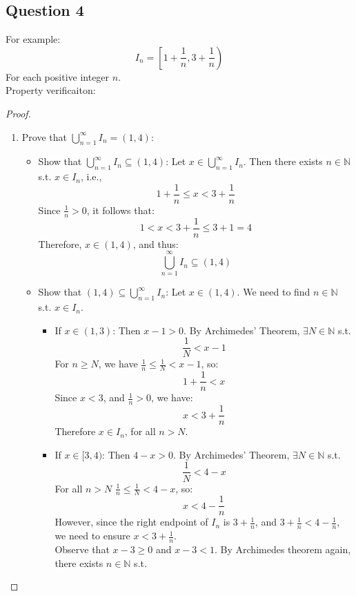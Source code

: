 \documentclass{article}
\begin{document}
\subsection*{Question 4}
For example:
\[ I_n = \left[ 1 + \frac{1}{n}, 3 + \frac{1}{n} \right) \]
For each positive integer $n$.
\\
Property verificaiton:
\begin{proof}
\hspace*{0.001cm}
\\
\begin{enumerate}
    \item Prove that \( \bigcup_{n=1}^{\infty} I_n = (1, 4) \):
    \begin{itemize}
        \item Show that \( \bigcup_{n = 1}^{\infty} I_n \subseteq (1, 4) \):
        Let \( x \in \bigcup_{n = 1}^{\infty} I_n \). Then there exists $n \in \mathbb{N}$ s.t. $x \in I_n$, i.e.,
        \[ 1 + \frac{1}{n} \leq x < 3 + \frac{1}{n} \]
        Since \( \frac{1}{n} > 0 \), it follows that:
        \[ 1 < x < 3 + \frac{1}{n} \leq 3 + 1 = 4 \]
        Therefore, \( x \in (1, 4) \), and thus:
        \[ \bigcup_{n = 1}^{\infty} I_n \subseteq (1, 4) \]
        \item Show that \( (1, 4) \subseteq \bigcup_{n = 1}^{\infty} I_n \):
        Let \( x \in (1, 4) \). We need to find $n \in \mathbb{N}$ s.t. $x \in I_n$.
        \begin{itemize}
            \item If \( x \in (1, 3) \):
            Then \(x - 1 > 0 \). By Archimedes' Theorem, \( \exists N \in \mathbb{N} \) s.t.
            \[ \frac{1}{N} < x - 1 \]
            For \( n \geq N \), we have \( \frac{1}{n} \leq \frac{1}{N} < x - 1 \), so:
            \[ 1 + \frac{1}{n} < x \]
            Since \(x < 3\), and \( \frac{1}{n} > 0 \), we have:
            \[ x < 3 + \frac{1}{n} \]
            Therefore \( x \in I_n \), for all $n > N$.
            \item If \( x \in [3, 4) \):
            Then $4 - x > 0$. By Archimedes' Theorem, \( \exists N \in \mathbb{N} \) s.t.
            \[ \frac{1}{N} < 4 - x \]
            For all $n > N$ $\frac{1}{n} \leq \frac{1}{N} < 4 - x$, so:
            \[ x < 4 - \frac{1}{n} \]
            However, since the right endpoint of $I_n$ is $3 + \frac{1}{n}$, and $3 + \frac{1}{n} < 4 - \frac{1}{n}$,
            we need to ensure $x < 3 + \frac{1}{n}$.
            \\
            Observe that $x - 3 \geq 0$ and $x - 3 < 1$. By Archimedes theorem again, there exists $n \in \mathbb{N}$ s.t.

\end{itemize}
\end{itemize}
\end{enumerate}
\end{proof}
\end{document}
